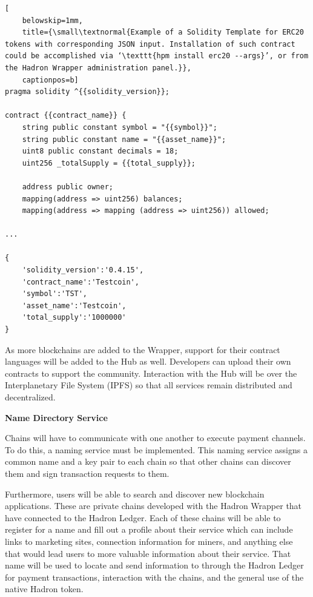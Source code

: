 \documentclass{%
	article}
\begin{document}
\begin{lstlisting}[
	belowskip=1mm,
	title={\small\textnormal{Example of a Solidity Template for ERC20 tokens with corresponding JSON input. Installation of such contract could be accomplished via ‘\texttt{hpm install erc20 --args}’, or from the Hadron Wrapper administration panel.}},
	captionpos=b]
pragma solidity ^{{solidity_version}};

contract {{contract_name}} {
    string public constant symbol = "{{symbol}}";
    string public constant name = "{{asset_name}}";
    uint8 public constant decimals = 18;
    uint256 _totalSupply = {{total_supply}};

    address public owner;
    mapping(address => uint256) balances;
    mapping(address => mapping (address => uint256)) allowed;
    
...

{
    'solidity_version':'0.4.15',
    'contract_name':'Testcoin',
    'symbol':'TST',
    'asset_name':'Testcoin',
    'total_supply':'1000000'
}
\end{lstlisting}

As more blockchains are added to the Wrapper, support for their contract languages will be added to the Hub as well. Developers can upload their own contracts to support the community. Interaction with the Hub will be over the Interplanetary File System (IPFS) so that all services remain distributed and decentralized.

\begin{center}
\textbf{Name Directory Service}
\end{center}

Chains will have to communicate with one another to execute payment channels. To do this, a naming service must be implemented. This naming service assigns a common name and a key pair to each chain so that other chains can discover them and sign transaction requests to them.

Furthermore, users will be able to search and discover new blockchain applications. These are private chains developed with the Hadron Wrapper that have connected to the Hadron Ledger. Each of these chains will be able to register for a name and fill out a profile about their service which can include links to marketing sites, connection information for miners, and anything else that would lead users to more valuable information about their service. That name will be used to locate and send information to through the Hadron Ledger for payment transactions, interaction with the chains, and the general use of the native Hadron token.
\end{document}
